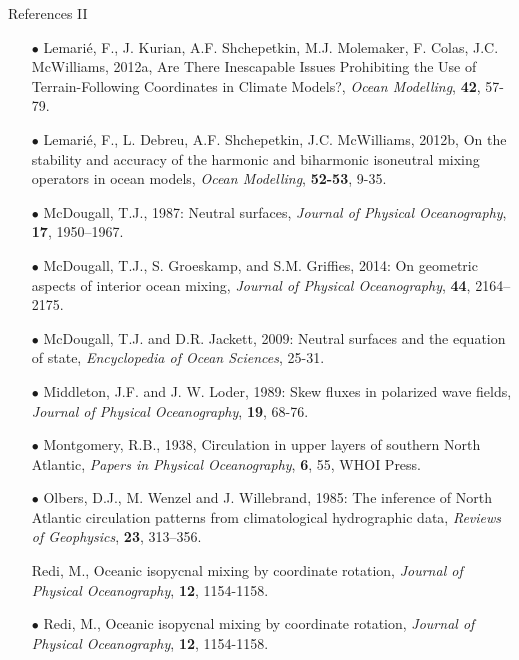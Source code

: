 \documentclass{beamer}
\begin{document}
\begin{frame}{References II}

\begin{itemize}
\tiny


\item[$\bullet$] Lemari{\'{e}}, F., J. Kurian,  A.F. Shchepetkin,  M.J. Molemaker, F. Colas, J.C. McWilliams, 2012a, Are There Inescapable Issues Prohibiting the Use of Terrain-Following Coordinates in Climate Models?,
{\it Ocean Modelling}, {\bf 42}, 57-79.

\item[$\bullet$] Lemari{\'{e}}, F., L. Debreu, A.F. Shchepetkin,  J.C. McWilliams, 2012b, On the stability and accuracy of the harmonic and biharmonic isoneutral mixing operators in ocean models, {\it Ocean Modelling},
{\bf 52-53}, 9-35.

\item[$\bullet$] McDougall, T.J., 1987: Neutral surfaces,
{\it Journal of Physical Oceanography}, {\bf 17}, 1950--1967.

\item[$\bullet$] McDougall, T.J., S. Groeskamp, and S.M. Griffies, 2014: On geometric aspects of interior ocean mixing, {\it Journal of Physical Oceanography}, {\bf 44}, 2164--2175.

\item[$\bullet$] McDougall, T.J. and D.R. Jackett, 2009: Neutral surfaces and the equation of state, {\it Encyclopedia of Ocean Sciences}, 25-31. 

\item[$\bullet$] Middleton, J.F. and J. W. Loder, 1989:
Skew fluxes in polarized wave fields, {\it Journal of Physical Oceanography}, {\bf 19}, 68-76.

\item[$\bullet$] Montgomery, R.B., 1938, Circulation in upper layers of southern North Atlantic, 
{\it Papers in Physical Oceanography}, {\bf 6}, 55, 
WHOI Press. 

\item[$\bullet$] Olbers, D.J., M. Wenzel and J. Willebrand, 1985: The inference of North Atlantic circulation patterns from climatological hydrographic data, {\it Reviews of Geophysics}, {\bf 23}, 313--356.

Redi, M., Oceanic isopycnal mixing by coordinate rotation, {\it Journal of Physical Oceanography}, {\bf 12}, 1154-1158.

\item[$\bullet$] Redi, M., Oceanic isopycnal mixing by coordinate rotation, {\it Journal of Physical Oceanography}, {\bf 12}, 1154-1158.


\end{itemize}
\end{frame}
\end{document}
